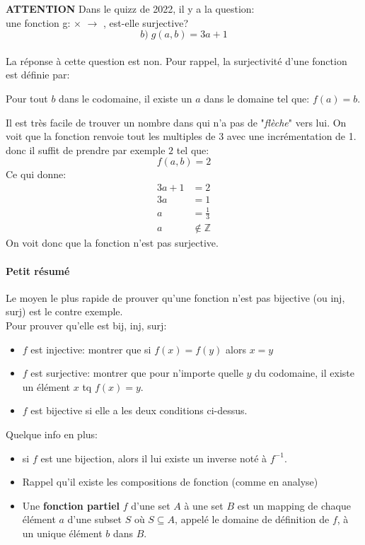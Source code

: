 \begin{framedremark}
    \textbf{ATTENTION} Dans le quizz de 2022, il y a la question:\\
    une fonction g: \Z $\times$ \Z $\to$ \Z, est-elle surjective?
\[b) \; g(a, b) = 3a + 1\]
\\
La réponse à cette question est non. Pour rappel, la surjectivité d'une fonction est définie par: 
\\
\begin{center}
    Pour tout $b$ dans le codomaine, il existe un $a$ dans le domaine tel que: $f(a) = b$.
\end{center}
Il est très facile de trouver un nombre dans \Z qui n'a pas de "\textit{flèche}" vers lui. On voit que la fonction renvoie tout les multiples de 3 avec une incrémentation de 1. donc il suffit de prendre par exemple $2$ tel que: 
\[f(a, b) = 2\]
Ce qui donne: 
\begin{align*}
    3a + 1 &= 2\\
    3a &= 1 \\
    a &= \frac{1}{3}\\
    a &\notin \mathbb{Z}
\end{align*}
On voit donc que la fonction n'est pas surjective.
\end{framedremark}

\paragraph{Petit résumé}
Le moyen le plus rapide de prouver qu'une fonction n'est pas bijective (ou inj, surj) est le contre exemple. 
\\
Pour prouver qu'elle est bij, inj, surj:
\begin{itemize}
    \item $f$ est injective: montrer que si $f(x) = f(y)$ alors $x = y$
    \item $f$ est surjective: montrer que pour n'importe quelle $y$ du codomaine, il existe un élément $x$ tq $f(x) = y$.
    \item $f$ est bijective si elle a les deux conditions ci-dessus.
\end{itemize}

Quelque info en plus:
\begin{itemize}
    \item si $f$ est une bijection, alors il lui existe un inverse noté à $f^{-1}$.
    \item Rappel qu'il existe les compositions de fonction (comme en analyse)
    \item Une \textbf{fonction partiel} $f$ d'une set $A$ à une set $B$ est un mapping de chaque élément $a$ d'une subset $S$ où $S \subseteq A$, appelé le domaine de définition de $f$, à un unique élément $b$ dans $B$.
    
\end{itemize}




